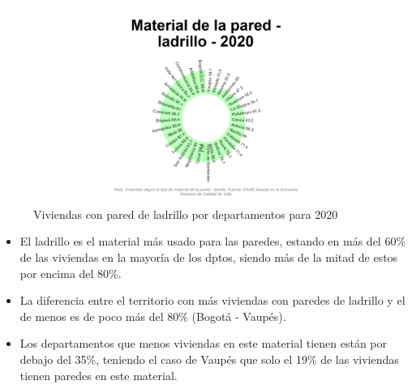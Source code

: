     \begin{figure}[H]
        \caption{Viviendas con pared de ladrillo por departamentos para 2020 \label{map_result_2} }
        \begin{center}
        \includegraphics[width=\textwidth,keepaspectratio]{img/var_150_static.png}
        \end{center}
    \end{figure}
            \begin{itemize}
                    \item El ladrillo es el material más usado para las paredes, estando en más del 60\% de las viviendas en la mayoría de los dptos, siendo más de la mitad de estos por encima del 80\%.
                    \item La diferencia entre el territorio con más viviendas con paredes de ladrillo y el de menos es de poco más del 80\% (Bogotá - Vaupés).
                    \item Los departamentos que menos viviendas en este material tienen están por debajo del 35\%, teniendo el caso de Vaupés que solo el 19\% de las viviendas tienen paredes en este material.
                    \end{itemize}

